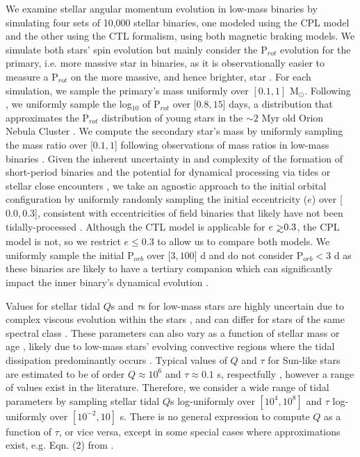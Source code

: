 \documentclass[twocolumn]{aastex61}
\def\gsim{~\rlap{$>$}{\lower 1.0ex\hbox{$\sim$}}}
\begin{document}
We examine stellar angular momentum evolution in low-mass binaries by simulating four sets of 10,000 stellar binaries, one modeled using the CPL model and the other using the CTL formalism, using both magnetic braking models.  We simulate both stars' spin evolution but mainly consider the P$_{rot}$ evolution for the primary, i.e. more massive star in binaries, as it is observationally easier to measure a P$_{rot}$ on the more massive, and hence brighter, star \citep[e.g.][]{Meibom2006,Lurie2017}. For each simulation, we sample the primary's mass uniformly over $[0.1, 1]$ M$_{\odot}$. Following \citet{Matt2015}, we uniformly sample the log$_{10}$ of P$_{rot}$ over [$0.8,15$] days, a distribution that approximates the P$_{rot}$ distribution of young stars in the ${\sim}2$ Myr old Orion Nebula Cluster \citep{Stassun1999,Herbst2001,Herbst2002,Rodriguez-Ledesma2009}.  We compute the secondary star's mass by uniformly sampling the mass ratio over [$0.1, 1$] following observations of mass ratios in low-mass binaries \citep{Raghavan2010,Moe2018}. Given the inherent uncertainty in and complexity of the formation of short-period binaries \citep[e.g.][]{Bonnell1994,Bate2000,Bate2002,Moe2018} and the potential for dynamical processing via tides or stellar close encounters \citep[e.g.][]{Mardling2001,Hurley2002,Ivanova2005,Meibom2005}, we take an agnostic approach to the initial orbital configuration by uniformly randomly sampling the initial eccentricity ($e$) over [$0.0,0.3$], consistent with eccentricities of field binaries that likely have not been tidally-processed \citep{Raghavan2010}. Although the CTL model is applicable for $e \gsim 0.3$, the CPL model is not, so we restrict $e \leq 0.3$ to allow us to compare both models.
We uniformly sample the initial P$_{orb}$ over [$3,100$] d and do not consider P$_{orb} < 3$ d as these binaries are likely to have a tertiary companion \citep{Tokovinin2006} which can significantly impact the inner binary's dynamical evolution \citep[e.g.][]{Munoz2015,Martin2015b,Hamers2016,Moe2018}. 

Values for stellar tidal $Q$s and $\tau$s for low-mass stars are highly uncertain due to complex viscous evolution within the stars \citep{Ogilvie2007}, and can differ for stars of the same spectral class \citep{Barker2009}. These parameters can also vary as a function of stellar mass or age \citep{Bolmont2016,vanEylen2016}, likely due to low-mass stars' evolving convective regions where the tidal dissipation predominantly occurs \citep{Zahn2008}. Typical values of $Q$ and $\tau$ for Sun-like stars are estimated to be of order $Q \approx 10^6$ and $\tau \approx 0.1$ s, respectfully \citep[e.g.][]{Meibom2005,Ogilvie2007,Jackson2008}, however a range of values exist in the literature.  Therefore, we consider a wide range of tidal parameters by sampling stellar tidal $Q$s log-uniformly over $[10^4,10^8]$ and $\tau$ log-uniformly over $[10^{-2},10]$ s.  There is no general expression to compute $Q$ as a function of $\tau$, or vice versa, except in some special cases where approximations exist, e.g. Eqn. (2) from \citet{Heller2011}. 
\end{document}
